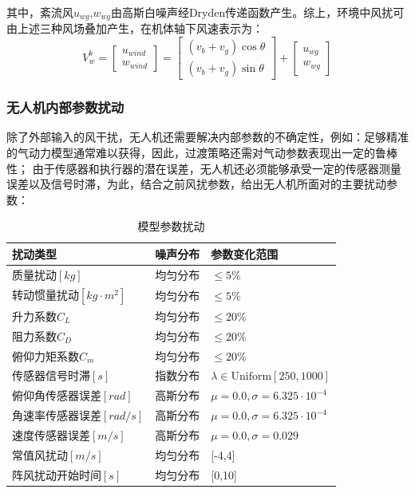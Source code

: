 其中，紊流风$u_{wg}$,$w_{wg}$由高斯白噪声经Dryden传递函数产生。综上，环境中风扰可由上述三种风场叠加产生，在机体轴下风速表示为：
\begin{equation}
    V_{w}^{b}=\begin{bmatrix}
        u_{wind}\\
    w_{wind}
    \end{bmatrix}=  \begin{bmatrix}
        (v_{b}+v_{g})\cos\theta \\
        (v_{b}+v_{g})\sin\theta
    \end{bmatrix}+\begin{bmatrix}
        u_{wg}\\
    w_{wg}
    \end{bmatrix}
\end{equation}

\subsubsection{无人机内部参数扰动}
除了外部输入的风干扰，无人机还需要解决内部参数的不确定性，例如：足够精准的气动力模型通常难以获得，因此，过渡策略还需对气动参数表现出一定的鲁棒性；
由于传感器和执行器的潜在误差，无人机还必须能够承受一定的传感器测量误差以及信号时滞，为此，结合之前风扰参数，给出无人机所面对的主要扰动参数：
\begin{table}
    \centering
    \caption{模型参数扰动}
    \label{tab:paramdisturbance}
    \begin{tabular*}{0.8\textwidth}{@{\extracolsep{\fill}}lll}
        \toprule
        扰动类型 & 噪声分布 & 参数变化范围 \\
        \midrule
        质量扰动\( \left [ kg \right ]  \) & 均匀分布 &  \( \le 5\% \)\\
        转动惯量扰动\( \left [ kg \cdot m^{2} \right ]  \) & 均匀分布 & \( \le 5\% \) \\
        升力系数\(C_{L}\) & 均匀分布 & \( \le 20\% \) \\
        阻力系数\(C_{D}\) & 均匀分布 & \( \le 20\% \) \\
        俯仰力矩系数\(C_{m} \) & 均匀分布 & \( \le 20\% \) \\
        传感器信号时滞\( \left [ s \right ]  \) & 指数分布 & \(\lambda\in  \text{Uniform}[ 250,1000] \) \\
        俯仰角传感器误差\( \left [ rad \right ]  \) & 高斯分布 & \(\mu = 0.0 ,\sigma = 6.325 \cdot 10^{-4}\) \\
        角速率传感器误差\( \left [ rad/s \right ]  \) & 高斯分布 & \( \mu = 0.0 ,\sigma = 6.325 \cdot 10^{-4}\) \\
        速度传感器误差\( \left [ m/s \right ]  \) & 高斯分布 & \( \mu = 0.0 ,\sigma = 0.029 \) \\
        常值风扰动\( \left [ m/s \right ]  \) & 均匀分布 & [-4,4]  \\
        阵风扰动开始时间\( \left [ s \right ]\) &均匀分布 & [0,10]\\
        \bottomrule
    \end{tabular*}
\end{table}

